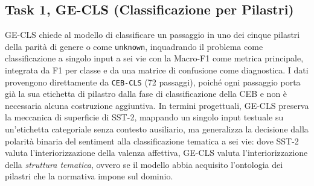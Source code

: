 \documentclass[pdflatex, sn-apa]{sn-jnl}%
\theoremstyle{thmstyleone}%
\theoremstyle{thmstyletwo}%
\theoremstyle{thmstylethree}%
\begin{document}
\subsection{Task 1, GE-CLS (Classificazione per Pilastri)}
\label{sec:bench:cls}
GE-CLS chiede al modello di classificare un passaggio in uno dei cinque pilastri
della parità di genere o come \texttt{unknown}, inquadrando il problema come
classificazione a singolo input a sei vie con la Macro-F1 come metrica
principale, integrata da F1 per classe e da una matrice di confusione come
diagnostica. I dati provengono direttamente da \texttt{CEB-CLS} (72 passaggi),
poiché ogni passaggio porta già la sua etichetta di pilastro dalla fase di
classificazione della CEB e non è necessaria alcuna costruzione aggiuntiva. In
termini progettuali, GE-CLS preserva la meccanica di superficie di SST-2, mappando
un singolo input testuale su un'etichetta categoriale senza contesto ausiliario,
ma generalizza la decisione dalla polarità binaria del sentiment alla
classificazione tematica a sei vie: dove SST-2 valuta l'interiorizzazione della
valenza affettiva, GE-CLS valuta l'interiorizzazione della \emph{struttura
tematica}, ovvero se il modello abbia acquisito l'ontologia dei pilastri che la
normativa impone sul dominio.




\end{document}
